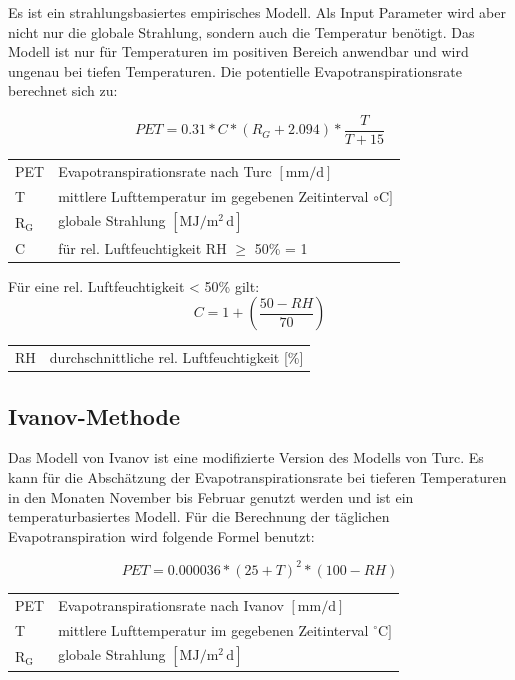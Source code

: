 Es ist ein strahlungsbasiertes empirisches Modell. Als Input Parameter wird aber nicht nur die globale Strahlung, sondern auch die Temperatur benötigt. Das Modell ist nur für Temperaturen im positiven Bereich anwendbar und wird ungenau bei tiefen Temperaturen. Die potentielle Evapotranspirationsrate berechnet sich zu:

\begin{equation}
\label{eq:turc}
PET=0.31*C*\left(R_G+2.094\right)*\frac{T}{T+15}
\end{equation}
\begin{table}[H]
\centering
\begin{tabular}{ll}
PET & Evapotranspirationsrate nach Turc  $\mathrm{[mm/d]}$\\
T & mittlere Lufttemperatur im gegebenen Zeitinterval $\mathrm{{\circ}C]}$\\
$\mathrm{R_G}$ & globale Strahlung $\mathrm{[MJ/m^2\,d]}$\\
C & für rel. Luftfeuchtigkeit RH $\geq$ 50\% = 1\\
\end{tabular}
\end{table}
Für eine rel. Luftfeuchtigkeit < 50\% gilt:
\begin{equation}
\label{eq:turc_c}
C=1+\left(\frac{50-RH}{70}\right)
\end{equation}
\begin{table}[H]
\centering
\begin{tabular}{ll}
RH& durchschnittliche rel. Luftfeuchtigkeit [\%]\\
\end{tabular}
\end{table}

\subsection{Ivanov-Methode}
Das Modell von Ivanov ist eine modifizierte Version des Modells von Turc. Es kann für die Abschätzung der Evapotranspirationsrate bei tieferen Temperaturen in den Monaten November bis Februar genutzt werden und ist ein temperaturbasiertes Modell. Für die Berechnung der täglichen Evapotranspiration wird folgende Formel benutzt:

\begin{equation}
\label{eq:ivanov_d}
PET=0.000036*(25+T)^2*(100-RH)
\end{equation}
\begin{table}[H]
\centering
\begin{tabular}{ll}
PET & Evapotranspirationsrate nach Ivanov  $\mathrm{[mm/d]}$\\
T & mittlere Lufttemperatur im gegebenen Zeitinterval $\mathrm{{^\circ}C]}$\\
$\mathrm{R_G}$ & globale Strahlung $\mathrm{[MJ/m^2\,d]}$\\
\end{tabular}
\end{table}

